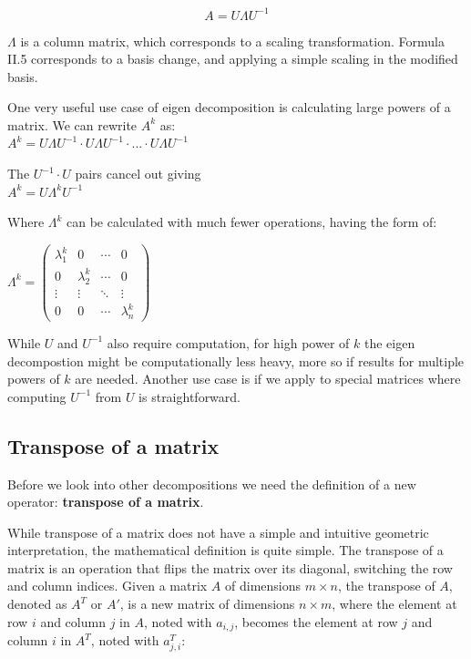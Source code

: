 \begin{equation}A = U\Lambda U^{-1} \tag{II.5}\end{equation}

\(\Lambda\) is a column matrix, which corresponds to a scaling transformation. Formula II.5 corresponds to a basis change, and applying a simple scaling in the modified basis.

One very useful use case of eigen decomposition is calculating large powers of a matrix. We can rewrite \(A^k\) as:\\
\(A^k = U \Lambda U^{-1} \cdot U\Lambda U^{-1}  \cdot ...  \cdot U\Lambda U^{-1}\)

The \(U^{-1} \cdot U\) pairs cancel out giving\\
\(A^k = U \Lambda^k U^{-1}\)

Where \(\Lambda^k\) can be calculated with much fewer operations, having the form of:

\(\Lambda^k = \begin{pmatrix}
  \lambda_1^k & 0 & \cdots & 0 \\
  0 & \lambda_2^k & \cdots & 0 \\
  \vdots  & \vdots  & \ddots & \vdots  \\
  0 & 0 & \cdots & \lambda_n^k
 \end{pmatrix}\)

While \(U\) and \(U^{-1}\) also require computation, for high power of \(k\) the eigen decompostion might be computationally less heavy, more so if results for multiple powers of \(k\) are needed. Another use case is if we apply to special matrices where computing \(U^{-1}\) from \(U\) is straightforward.

\subsection{Transpose of a matrix}

Before we look into other decompositions we need the definition of a new operator: \textbf{transpose of a matrix}.

While transpose of a matrix does not have a simple and intuitive geometric interpretation, the mathematical definition is quite simple. The transpose of a matrix is an operation that flips the matrix over its diagonal, switching the row and column indices. Given a matrix \(A\) of dimensions \(m \times n\), the transpose of \(A\), denoted as \(A^T\) or \(A'\), is a new matrix of dimensions \(n \times m\), where the element at row \(i\) and column \(j\) in \(A\), noted with \(a_{i,j}\), becomes the element at row \(j\) and column \(i\) in \(A^T\), noted with \(a^T_{j,i}\):

